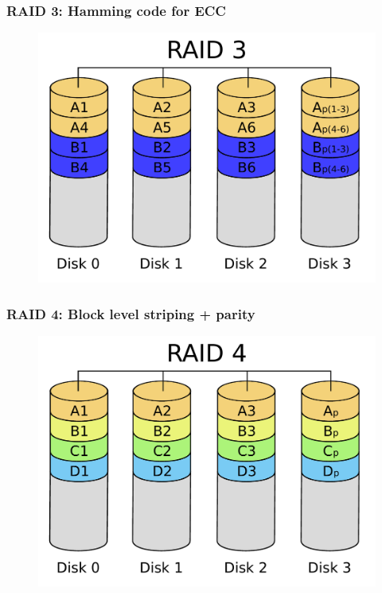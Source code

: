 \documentclass{beamer}
\begin{document}
\begin{frame}
    \frametitle{RAID 3: Hamming code for ECC}
    \begin{figure}
    \includegraphics[height=0.3\paperwidth]{RAID3.pdf}
    \end{figure}
\end{frame}


\begin{frame}
    \frametitle{RAID 4: Block level striping + parity}
    \begin{figure}
    \includegraphics[height=0.3\paperwidth]{RAID4.pdf}
    \end{figure}
\end{frame}
\end{document}
